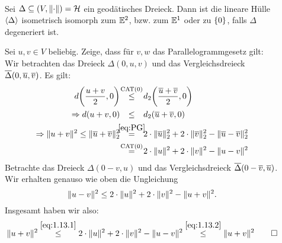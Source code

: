 \begin{beweis}
	\mbox{} \\[-.85cm]
	\begin{description}
		\item[\bewrueck] Sei $\Delta \subseteq (V,\lVert\cdot\rVert) = \mathcal{H}$ ein geodätisches Dreieck.
		Dann ist die lineare Hülle $\langle\Delta\rangle$ isometrisch isomorph zum $\mathbb{E}^2$, bzw. zum $\mathbb{E}^1$ oder zu $\{0\}$, falls $\Delta$ degeneriert ist.
		\item[\bewhin] Sei $u,v \in V$ beliebig.
		Zeige, dass für $v,w$ das Parallelogrammgesetz gilt:
		Wir betrachten das Dreieck $\Delta(0,u,v)$ und das Vergleichsdreieck $\overline{\Delta}(0,\overline{u},\overline{v})$.
		Es gilt:
		\begin{align}
			d\enbrace*{\frac{u+v}{2},0} &\makebox[1cm][c]{$\stackrel{\CAT}{\leq}$} d_2\enbrace*{\frac{\ol{u}+\ol{v}}{2},0} \\
			\Rightarrow  d(u+v,0) &\makebox[1cm][c]{$\leq$} d_2(\ol{u}+\ol{v},0) \\
			\Rightarrow \Norm{u+v}^2 \leq \Norm{\ol{u}+\ol{v}}_2^2 &\makebox[1cm][c]{$\stackrel{\eqref{eq:PG}}{=}$} 2 \cdot \Norm{\ol{u}}_2^2 + 2 \cdot \Norm{\ol{v}}_2^2 - \Norm{\ol{u}-\ol{v}}_2^2 \\
			&\makebox[1cm][c]{$\stackrel{\CAT}{=}$} 2 \cdot \Norm{u}^2 + 2 \cdot \Norm{v}^2 - \Norm{u-v}^2 \label{eq:1.13.1}
		\end{align}
		Betrachte das Dreieck $\Delta(0-v,u)$ und das Vergleichsdreieck $\overline{\Delta}(0-\overline{v},\overline{u})$.
		Wir erhalten genauso wie oben die Ungleichung
		\begin{equation}
			\lVert u-v\rVert^2 \leq 2 \cdot \lVert u\rVert^2 + 2 \cdot \lVert v\rVert^2 - \lVert u+v\rVert^2. \label{eq:1.13.2}
		\end{equation}
		Insgesamt haben wir also:
		\[
			\lVert u+v\rVert^2 \stackrel{\eqref{eq:1.13.1}}{\leq} 2 \cdot \lVert u\rVert^2 + 2\cdot \lVert v\rVert^2 - \lVert u-v\rVert^2 \stackrel{\eqref{eq:1.13.2}}{\leq} \lVert u+v\rVert^2 \qedhere
		\]
	\end{description}
\end{beweis}

\vspace*{.5cm}

